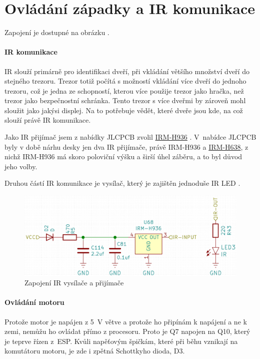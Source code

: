 \section{Ovládání západky a IR komunikace}

Zapojení je dostupné na obrázku .

\paragraph{IR komunikace}
IR slouží primárně pro identifikaci dveří, při vkládání většího množství dveří do stejného trezoru.
Trezor totiž počítá s možností vkládání více dveří do jednoho trezoru, což je jedna ze schopností, kterou více použije trezor jako hračka, než trezor jako bezpečnostní schránka.
Tento trezor s více dveřmi by zároveň mohl sloužit jako jakýsi displej. Na to potřebuje vědět, které dveře jsou kde, na což slouží právě IR komunikace. %

Jako IR přijímač jsem z nabídky JLCPCB \parencite{JLCPCB} zvolil \href{https://datasheet.lcsc.com/szlcsc/1912111437_Everlight-Elec-IRM-H936-TR2_C264266.pdf}{IRM-H936} \parencite{irm-h936}. 
V~nabídce JLCPCB byly v době nárhu desky jen dva IR při\-jí\-ma\-če, právě IRM-H936 a \href{https://datasheet.lcsc.com/szlcsc/2010221806_Everlight-Elec-IRM-H638T-TR2-DX_C390031.pdf}{IRM-H638},
z nichž IRM-H936 má skoro poloviční výšku a širší úhel záběru, a to byl důvod jeho volby.

Druhou částí IR komunikace je vysílač, který je zajištěn jednoduše IR LED \parencite{ir19-21c/tr8}.

\begin{figure}[htbp]
    \centering
    \includegraphics[width=\textwidth]{kapitoly/obrazky/E4/ir_motor_enkoder/IR.png}
    \caption{Zapojení IR vysílače a přijímače}
    \label{fig:E4-ir}
\end{figure}

\paragraph{Ovládání motoru}
Protože motor je napájen z 5~V větve a protože ho připínám k napájení a ne k zemi, nemůžu ho ovládat přímo z procesoru. Proto je Q7 napojen na Q10, který je teprve řízen z~ESP. 
Kvůli napěťovým špičkám, které při běhu vznikají na komutátoru motoru, je zde i zpětná Schottkyho dioda, D3.

